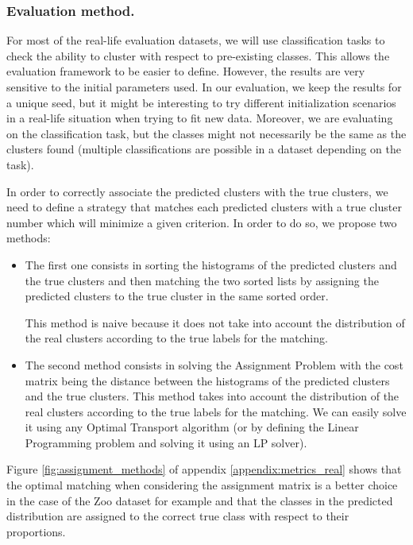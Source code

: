 \subsubsection{Evaluation method.} \label{sec:evaluation_method}
For most of the real-life evaluation datasets, we will use classification tasks to check the ability to cluster with respect to pre-existing classes. This allows the evaluation framework to be easier to define. However, the results are very sensitive to the initial parameters used. In our evaluation, we keep the results for a unique seed, but it might be interesting to try different initialization scenarios in a real-life situation when trying to fit new data. 
Moreover, we are evaluating on the classification task, but the classes might not necessarily be the same as the clusters found (multiple classifications are possible in a dataset depending on the task).

In order to correctly associate the predicted clusters with the true clusters, we need to define a strategy that matches each predicted clusters with a true cluster number which will minimize a given criterion.
In order to do so, we propose two methods:
\begin{itemize}
    \item The first one consists in sorting the histograms of the predicted clusters and the true clusters and then matching the two sorted lists by assigning the predicted clusters to the true cluster in the same sorted order.
    
    This method is naive because it does not take into account the distribution of the real clusters according to the true labels for the matching.
    
\item The second method consists in solving the Assignment Problem \citep{kuhn1955hungarian} with the cost matrix being the distance between the histograms of the predicted clusters and the true clusters. This method takes into account the distribution of the real clusters according to the true labels for the matching. We can easily solve it using any Optimal Transport algorithm (or by defining the Linear Programming problem and solving it using an LP solver).
\end{itemize}
Figure \ref{fig:assignment_methods} of appendix \ref{appendix:metrics_real} shows that the optimal matching when considering the assignment matrix is a better choice in the case of the Zoo dataset for example and that the classes in the predicted distribution are assigned to the correct true class with respect to their proportions.


